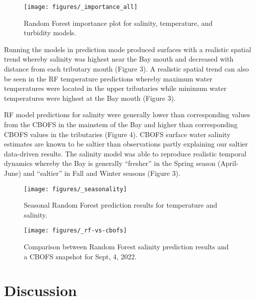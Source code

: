 \documentclass{article}
\begin{document}
\begin{figure}[ht!]
    \begin{center}
          \texttt{[image: figures/\_importance\_all]}
          \caption{Random Forest importance plot for salinity, temperature, and turbidity models.}
    \end{center}    
\end{figure}

Running the models in prediction mode produced surfaces with a realistic spatial trend whereby salinity was highest near the Bay mouth and decreased with distance from each tributary mouth (Figure 3). A realistic spatial trend can also be seen in the RF temperature predictions whereby maximum water temperatures were located in the upper tributaries while minimum water temperatures were highest at the Bay mouth (Figure 3).

RF model predictions for salinity were generally lower than corresponding values from the CBOFS in the mainstem of the Bay and higher than corresponding CBOFS values in the tributaries (Figure 4). CBOFS surface water salinity estimates are known to be saltier than observations \citep{lanerolle2011second, vogelAssessingSatelliteSea2016} partly explaining our saltier data-driven results. The salinity model was able to reproduce realistic temporal dynamics whereby the Bay is generally “fresher” in the Spring season (April-June) and “saltier” in Fall and Winter seasons (Figure 3).

\begin{figure}[ht!]
    \begin{center}
          \texttt{[image: figures/\_seasonality]}
          \caption{Seasonal Random Forest prediction results for temperature and salinity.}
    \end{center}    
\end{figure}

\begin{figure}[ht!]
    \begin{center}
          \texttt{[image: figures/\_rf-vs-cbofs]}
          \caption{Comparison between Random Forest salinity prediction results and a CBOFS snapshot for Sept, 4, 2022.}
    \end{center}    
\end{figure}

\section{Discussion}
\end{document}
